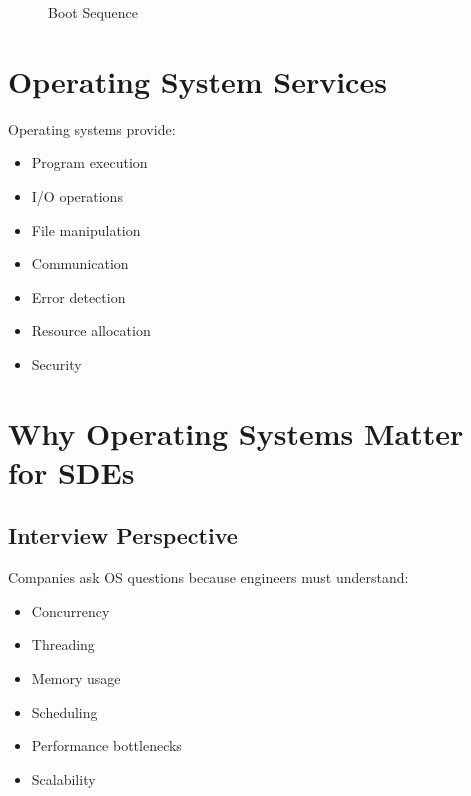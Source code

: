 \begin{figure}[H]
\centering
{}
\caption{Boot Sequence}
\end{figure}

\section{Operating System Services}

Operating systems provide:

\begin{itemize}
\item Program execution
\item I/O operations
\item File manipulation
\item Communication
\item Error detection
\item Resource allocation
\item Security
\end{itemize}

\section{Why Operating Systems Matter for SDEs}

\subsection{Interview Perspective}

Companies ask OS questions because engineers must understand:

\begin{itemize}
\item Concurrency
\item Threading
\item Memory usage
\item Scheduling
\item Performance bottlenecks
\item Scalability
\end{itemize}

